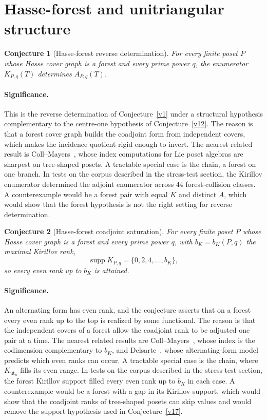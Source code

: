 \documentclass[11pt]{article}
\newtheorem{conjecture}{Conjecture}
\theoremstyle{definition}
\begin{document}
\section{Hasse-forest and unitriangular structure}

\begin{conjecture}[Hasse-forest reverse determination]\label{v15}
For every finite poset $P$ whose Hasse cover graph is a forest and every prime power $q$, the enumerator $K_{P,q}(T)$ determines $A_{P,q}(T)$.
\end{conjecture}

\paragraph{Significance.}
This is the reverse determination of Conjecture~\ref{v1} under a structural hypothesis complementary to the centre-one hypothesis of Conjecture~\ref{v12}.  The reason is that a forest cover graph builds the coadjoint form from independent covers, which makes the incidence quotient rigid enough to invert.  The nearest related result is Coll--Mayers~\cite{CM}, whose index computations for Lie poset algebras are sharpest on tree-shaped posets.  A tractable special case is the chain, a forest on one branch.  In tests on the corpus described in the stress-test section, the Kirillov enumerator determined the adjoint enumerator across $44$ forest-collision classes.  A counterexample would be a forest pair with equal $K$ and distinct $A$, which would show that the forest hypothesis is not the right setting for reverse determination.

\begin{conjecture}[Hasse-forest coadjoint saturation]\label{v16}
For every finite poset $P$ whose Hasse cover graph is a forest and every prime power $q$, with $b_K=b_K(P,q)$ the maximal Kirillov rank,
\[
\operatorname{supp}K_{P,q}=\{0,2,4,\ldots,b_K\},
\]
so every even rank up to $b_K$ is attained.
\end{conjecture}

\paragraph{Significance.}
An alternating form has even rank, and the conjecture asserts that on a forest every even rank up to the top is realized by some functional.  The reason is that the independent covers of a forest allow the coadjoint rank to be adjusted one pair at a time.  The nearest related results are Coll--Mayers~\cite{CM}, whose index is the codimension complementary to $b_K$, and Delsarte~\cite{Del}, whose alternating-form model predicts which even ranks can occur.  A tractable special case is the chain, where $K_{\mathrm{ut}_n}$ fills its even range.  In tests on the corpus described in the stress-test section, the forest Kirillov support filled every even rank up to $b_K$ in each case.  A counterexample would be a forest with a gap in its Kirillov support, which would show that the coadjoint ranks of tree-shaped posets can skip values and would remove the support hypothesis used in Conjecture~\ref{v17}.
\end{document}
